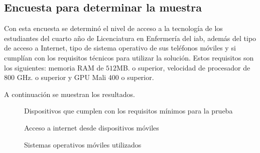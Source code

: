 
\subsection{Encuesta para determinar la muestra}
\label{encuesta_muestra}

Con esta encuesta se determinó el nivel de
acceso a la tecnología de los estudiantes del cuarto año de Licenciatura en
Enfermería del \gls{iab}, además del tipo de acceso a Internet, tipo de sistema
operativo de sus teléfonos móviles y si cumplían con los requisitos técnicos
para utilizar la solución. Estos requisitos son los siguientes:  memoria RAM de
$512$MB. o superior, velocidad de procesador de $800$ GHz. o superior y GPU Mali
400 o superior. 

A continuación se muestran los resultados.

\begin{figure}[H]
\centering
{}
\caption{Dispositivos que cumplen con los requisitos mínimos para la prueba}
\label{fig:ubicacion_requisitos_minimos}
\end{figure}

\begin{figure}
\centering
{}
\caption{Acceso a internet desde dispositivos móviles}
\label{fig:ubicacion_acceso_internet}
\end{figure}

\begin{figure}
\centering
{}
\caption{Sistemas operativos móviles utilizados}
\label{fig:ubicacion_sistemas_operativos}
\end{figure}


